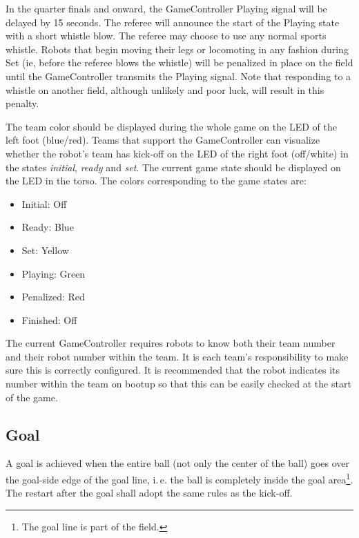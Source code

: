 \documentclass[12pt]{article}
\newcommand{\ie}{\mbox{i.\,e.}\xspace}
\begin{document}
In the quarter finals and onward, the GameController Playing signal will be delayed by 15 seconds.  The referee will announce the start of the Playing state with a short whistle blow.  The referee may choose to use any normal sports whistle.  Robots that begin moving their legs or locomoting in any fashion during Set (ie, before the referee blows the whistle) will be penalized in place on the field until the GameController transmits the Playing signal.  Note that responding to a whistle on another field, although unlikely and poor luck, will result in this penalty.

The team color should be displayed during the whole game on the LED of the left foot (blue/red). Teams that support the GameController can visualize whether the robot's team has kick-off on the LED of the right foot (off/white) in the states \emph{initial}, \emph{ready} and \emph{set}. The current game state should be displayed on the LED in the torso. The colors corresponding to the game states are:

\begin{itemize}

\item Initial: Off

\item Ready: Blue

\item Set: Yellow

\item Playing: Green

\item Penalized: Red

\item Finished: Off

\end{itemize}

The current GameController requires robots to know both their team number and their robot number within the team. It is each team's responsibility to make sure this is correctly configured. It is recommended that the robot indicates its number within the team on bootup so that this can be easily checked at the start of the game.

\subsection{Goal}
\label{sec:goal}
A goal is achieved when the entire ball (not only the center of the ball) goes over the goal-side edge of the goal line, \ie the ball is completely inside the goal area\footnote{The goal line is part of the field.}. The restart after the goal shall adopt the same rules as the kick-off.
\end{document}
